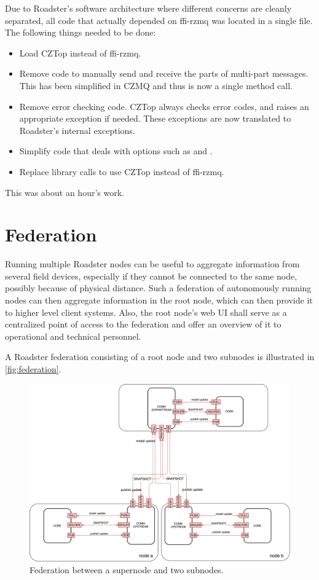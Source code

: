 Due to Roadster's software architecture where different concerns
are cleanly separated, all code that actually depended
on ffi-rzmq was located in a single file. The following
things needed to be done:

\begin{itemize}
\item Load CZTop instead of ffi-rzmq.
\item Remove code to manually send and receive the parts of multi-part messages. This has been simplified
in CZMQ and thus is now a single method call.
\item Remove error checking code. CZTop always checks error codes, and raises
an appropriate exception if needed. These exceptions are now translated to Roadster's internal exceptions.
\item Simplify code that deals with \zmq options such as  and .
\item Replace library calls to use CZTop instead of ffi-rzmq.
\end{itemize}

This was about an hour's work.


\pagebreak
\section{Federation}\label{sec:approach:federation}
Running multiple Roadster nodes can be useful to aggregate information from
several field devices, especially if they cannot be connected to the same node,
possibly because of physical distance. Such a federation of autonomously
running nodes can then aggregate information in the root node, which can then
provide it to higher level client systems. Also, the root node's web UI shall
serve as a centralized point of access to the federation and offer an overview
of it to operational and technical personnel.

A Roadster federation consisting of a root node and two subnodes is illustrated
in \autoref{fig:federation}.
\begin{figure}[]
	\includegraphics[width=\textwidth]{img/federation_protocol.pdf}
	\caption{Federation between a supernode and two subnodes.}
	\label{fig:federation}
\end{figure}

